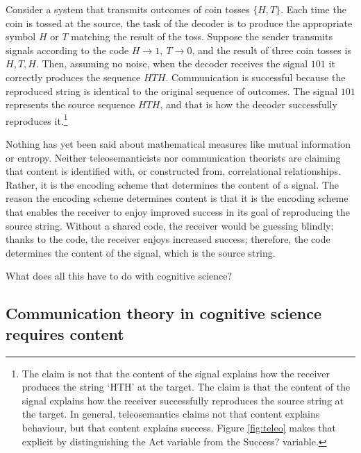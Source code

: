 \documentclass[12pt]{article}
\begin{document}
Consider a system that transmits outcomes of coin tosses $\{H,T\}$.
Each time the coin is tossed at the source, the task of the decoder is to produce the appropriate symbol $H$ or $T$ matching the result of the toss.
Suppose the sender transmits signals according to the code $H\rightarrow1,\ T\rightarrow0$, and the result of three coin tosses is $H, T, H$.
Then, assuming no noise, when the decoder receives the signal $101$ it correctly produces the sequence $HTH$.
Communication is successful because the reproduced string is identical to the original sequence of outcomes.
The signal $101$ represents the source sequence $HTH$, and that is how the decoder successfully reproduces it.\footnote{The claim is not that the content of the signal explains how the receiver produces the string `HTH' at the target. The claim is that the content of the signal explains how the receiver successfully reproduces the source string at the target. In general, teleosemantics claims not that content explains behaviour, but that content explains success. Figure \ref{fig:teleo} makes that explicit by distinguishing the Act variable from the Success? variable.}

Nothing has yet been said about mathematical measures like mutual information or entropy.
Neither teleosemanticists nor communication theorists are claiming that content is identified with, or constructed from, correlational relationships.
Rather, it is the encoding scheme that determines the content of a signal.
The reason the encoding scheme determines content is that it is the encoding scheme that enables the receiver to enjoy improved success in its goal of reproducing the source string.
Without a shared code, the receiver would be guessing blindly; thanks to the code, the receiver enjoys increased success; therefore, the code determines the content of the signal, which is the source string.

What does all this have to do with cognitive science?

\subsection{Communication theory in cognitive science requires content}
\end{document}

